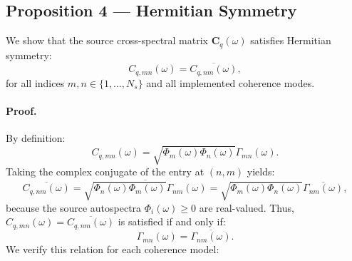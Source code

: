 \documentclass[11pt]{article}
\newcommand{\mat}[1]{\bm{#1}}
\begin{document}
\subsection{Proposition 4 --- Hermitian Symmetry}

We show that the source cross-spectral matrix $\mat{C}_q(\omega)$ satisfies Hermitian symmetry:
\begin{equation*}
    C_{q,mn}(\omega) = \overline{C_{q,nm}(\omega)},
\end{equation*}
for all indices $m, n \in \{1, \dots, N_s\}$ and all implemented coherence modes.

\paragraph{Proof.}
By definition:
\begin{equation*}
    C_{q,mn}(\omega) = \sqrt{\Phi_m(\omega)\Phi_n(\omega)} \Gamma_{mn}(\omega).
\end{equation*}
Taking the complex conjugate of the entry at $(n,m)$ yields:
\begin{equation*}
    \overline{C_{q,nm}(\omega)}
    =
    \overline{\sqrt{\Phi_n(\omega)\Phi_m(\omega)} \Gamma_{nm}(\omega)}
    =
    \sqrt{\Phi_m(\omega)\Phi_n(\omega)} \overline{\Gamma_{nm}(\omega)},
\end{equation*}
because the source autospectra $\Phi_i(\omega) \ge 0$ are real-valued. Thus, $C_{q,mn}(\omega) = \overline{C_{q,nm}(\omega)}$ is satisfied if and only if:
\begin{equation*}
    \Gamma_{mn}(\omega) = \overline{\Gamma_{nm}(\omega)}.
\end{equation*}
We verify this relation for each coherence model:
\end{document}
